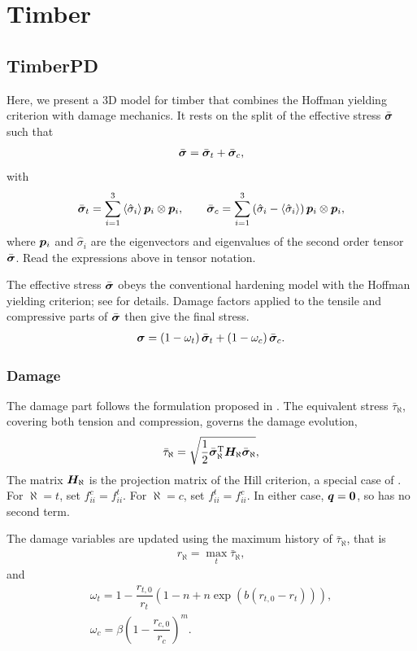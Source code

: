 \chapter{Timber}
\section{TimberPD}
Here, we present a 3D model for timber that combines the Hoffman yielding criterion with damage mechanics.
It rests on the split of the effective stress $\bar{\bm{\sigma}}$ such that
\begin{gather}
\bar{\bm{\sigma}}=\bar{\bm{\sigma}}_t+\bar{\bm{\sigma}}_c,
\end{gather}
with
\begin{gather}
\bar{\bm{\sigma}}_t=\sum_{i=1}^{3}\left\langle\hat{\sigma}_i\right\rangle\bm{p}_i\otimes\bm{p}_i,\qquad
\bar{\bm{\sigma}}_c=\sum_{i=1}^{3}\left(\hat{\sigma}_i-\left\langle\hat{\sigma}_i\right\rangle\right)\bm{p}_i\otimes\bm{p}_i,
\end{gather}
where $\bm{p}_i$ and $\hat{\sigma}_i$ are the eigenvectors and eigenvalues of the second order tensor $\bar{\bm{\sigma}}$.
Read the expressions above in tensor notation.

The effective stress $\bar{\bm{\sigma}}$ obeys the conventional hardening model with the Hoffman yielding criterion; see  for details.
Damage factors applied to the tensile and compressive parts of $\bar{\bm{\sigma}}$ then give the final stress.
\begin{gather}
\bm{\sigma}=\left(1-\omega_t\right)\bar{\bm{\sigma}}_t+\left(1-\omega_c\right)\bar{\bm{\sigma}}_c.
\end{gather}
\subsection{Damage}
The damage part follows the formulation proposed in \cite{SirumbalZapata2018}.
The equivalent stress $\bar{\tau}_{\aleph}$, covering both tension and compression, governs the damage evolution,
\begin{gather}\label{eq:timber_damage}
\bar{\tau}_{\aleph}=\sqrt{\dfrac{1}{2}\bar{\bm{\sigma}}_\aleph^{\mathrm{T}}\bm{H}_\aleph\bar{\bm{\sigma}}_\aleph},
\end{gather}
The matrix $\bm{H}_\aleph$ is the projection matrix of the Hill criterion, a special case of .
For $\aleph=t$, set $f_{ii}^c=f_{ii}^t$.
For $\aleph=c$, set $f_{ii}^t=f_{ii}^c$.
In either case, $\bm{q}=\bm{0}$, so  has no second term.

The damage variables are updated using the maximum history of $\bar{\tau}_{\aleph}$, that is
\begin{gather}
r_\aleph=\max_t\bar{\tau}_{\aleph},
\end{gather}
and
\begin{gather}
\omega_t=1-\dfrac{r_{t,0}}{r_t}\left(1-n+n\exp\left(b\left(r_{t,0}-r_t\right)\right)\right),\\
\omega_c=\beta\left(1-\dfrac{r_{c,0}}{r_c}\right)^m.
\end{gather}


